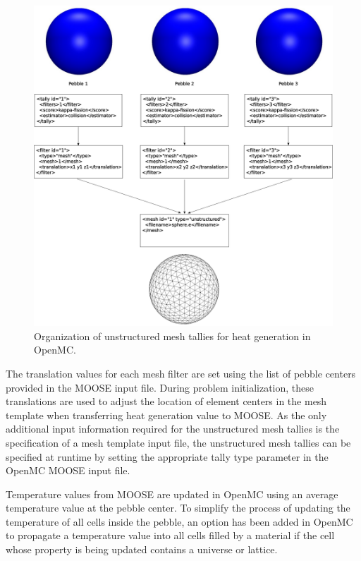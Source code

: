 \begin{figure}[ht]
    \centering
    \includegraphics[width=\textwidth]{Figures/umesh_tally_diagram}
    \caption{Organization of unstructured mesh tallies for heat generation in OpenMC.}
    \label{fig:umesh_tally_steup}
\end{figure}

The translation values for each mesh filter are set using the list of pebble centers provided in the MOOSE input file. During problem initialization, these translations are used to adjust the location of element centers in the mesh template when transferring heat generation value to MOOSE.
As the only additional input information required for the unstructured mesh tallies is the specification of a mesh template input file, the unstructured mesh tallies can be specified at runtime by setting the appropriate tally type parameter in the OpenMC MOOSE input file.

Temperature values from MOOSE are updated in OpenMC using an average temperature value at the pebble center. To simplify the process of updating the temperature of all cells inside the pebble, an option has been added in OpenMC to propagate a temperature value into all cells filled by a material if the cell whose property is being updated contains a universe or lattice.

